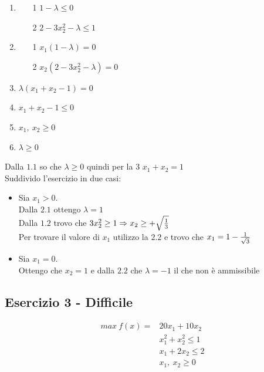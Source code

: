 \documentclass[12pt,a4paper]{article}
\begin{document}
\begin{enumerate}
\item \begin{enumerate}
\item[1] $1 - \lambda \leq 0$
\item[2] $2-3x_2^2 - \lambda \leq 1$\end{enumerate}
\item \begin{enumerate}
\item[1] $x_1(1-\lambda) = 0$
\item[2] $x_2(2-3x_2^2 - \lambda)=0$
\end{enumerate}
\item $\lambda(x_1+x_2-1) = 0$
\item $x_1+x_2-1 \leq 0$
\item $x_1,\ x_2 \geq 0$
\item $\lambda \geq 0$
\end{enumerate}

\SmallSep \noindent
Dalla $1.1$ so che $\lambda \geq 0$ quindi per la $3$ $x_1+x_2 =1$\\
Suddivido l'esercizio in due casi:
\begin{itemize}
\item Sia $x_1 > 0$.\\
Dalla $2.1$ ottengo $\lambda=1$\\
Dalla $1.2$ trovo che $3x_2^2 \geq 1 \Rightarrow x_2 \geq +\sqrt{1\over 3}$\\
Per trovare il valore di $x_1$ utilizzo la $2.2$ e trovo che $x_1 = 1-{1\over \sqrt{3}}$
\item Sia $x_1 = 0$.\\
Ottengo che $x_2 =1$ e dalla $2.2$ che $\lambda = -1$ il che non è ammissibile
\end{itemize}

\subsection{Esercizio 3 - Difficile}
\begin{equation*}
\begin{array}{rl}
max \ f(x) = & 20x_1+10x_2\\
& x_1^2 + x_2^2 \leq 1\\
& x_1 + 2x_2 \leq 2\\
& x_1,\ x_2 \geq 0
\end{array}
\end{equation*}
\end{document}
